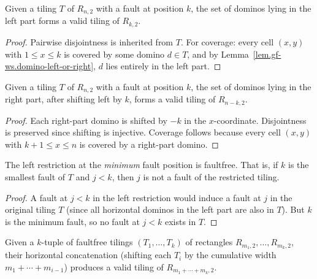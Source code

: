 \begin{lemma}
\label{lem.gf-ws.restrict-left}
\leanhelper
\leanok
Given a tiling $T$ of $R_{n,2}$ with a fault at position $k$, the set of
dominos lying in the left part forms a valid tiling of $R_{k,2}$.
\end{lemma}

\begin{proof}
\leanok
Pairwise disjointness is inherited from $T$. For coverage: every cell
$(x,y)$ with $1 \le x \le k$ is covered by some domino $d \in T$, and
by Lemma~\ref{lem.gf-ws.domino-left-or-right}, $d$ lies entirely in the
left part.
\end{proof}

\begin{lemma}
\label{lem.gf-ws.restrict-right}
\leanhelper
\leanok
Given a tiling $T$ of $R_{n,2}$ with a fault at position $k$, the set of
dominos lying in the right part, after shifting left by $k$, forms a valid
tiling of $R_{n-k,2}$.
\end{lemma}

\begin{proof}
\leanok
Each right-part domino is shifted by $-k$ in the $x$-coordinate. Disjointness
is preserved since shifting is injective. Coverage follows because every
cell $(x,y)$ with $k+1 \le x \le n$ is covered by a right-part domino.
\end{proof}

\begin{lemma}
\label{lem.gf-ws.restrict-left-faultfree}
\leanhelper
\leanok
The left restriction at the \emph{minimum} fault position is faultfree.
That is, if $k$ is the smallest fault of $T$ and $j < k$, then $j$ is not
a fault of the restricted tiling.
\end{lemma}

\begin{proof}
\leanok
A fault at $j < k$ in the left restriction would induce a fault at $j$ in
the original tiling $T$ (since all horizontal dominos in the left part are
also in $T$). But $k$ is the minimum fault, so no fault at $j < k$ exists
in $T$.
\end{proof}

\begin{lemma}
\label{lem.gf-ws.compose-tilings}
\leanhelper
\leanok
Given a $k$-tuple of faultfree tilings $(T_1, \ldots, T_k)$ of rectangles
$R_{m_1,2}, \ldots, R_{m_k,2}$, their horizontal concatenation (shifting
each $T_i$ by the cumulative width $m_1 + \cdots + m_{i-1}$) produces a
valid tiling of $R_{m_1 + \cdots + m_k, 2}$.
\end{lemma}

